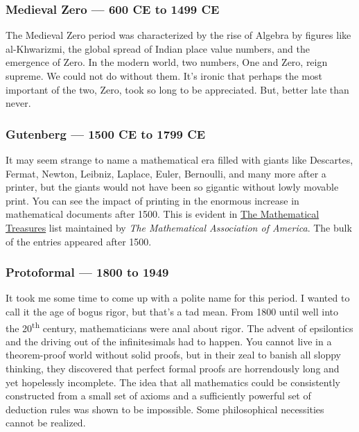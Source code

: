 \subsubsection*{Medieval Zero --- 600 CE to 1499 CE}%

The Medieval Zero period was characterized by the rise of Algebra by
figures like al-Khwarizmi, the global spread of Indian place value
numbers, and the emergence of Zero. In the modern world, two numbers,
One and Zero, reign supreme. We could not do without them. It's ironic
that perhaps the most important of the two, Zero, took so long to be
appreciated. But, better late than never.

\subsubsection*{Gutenberg --- 1500 CE to 1799 CE}%

It may seem strange to name a mathematical era filled with giants like
Descartes, Fermat, Newton, Leibniz, Laplace, Euler, Bernoulli, and many
more after a printer, but the giants would not have been so gigantic
without lowly movable print. You can see the impact of printing in the
enormous increase in mathematical documents after 1500. This is evident
in
\href{https://maa.org/press/periodicals/convergence/index-to-mathematical-treasures}{The
Mathematical Treasures} list maintained by \emph{The Mathematical
Association of America}. The bulk of the entries appeared after 1500.

\subsubsection*{Protoformal --- 1800 to 1949}%

It took me some time to come up with a polite name for this period. I
wanted to call it the age of bogus rigor, but that's a tad mean. From
1800 until well into the 20\textsuperscript{th} century, mathematicians
were anal about rigor. The advent of epsilontics and the driving out of
the infinitesimals had to happen. You cannot live in a theorem-proof
world without solid proofs, but in their zeal to banish all sloppy
thinking, they discovered that perfect formal proofs are horrendously
long and yet hopelessly incomplete. The idea that all mathematics could
be consistently constructed from a small set of axioms and a
sufficiently powerful set of deduction rules was shown to be impossible.
Some philosophical necessities cannot be realized.

